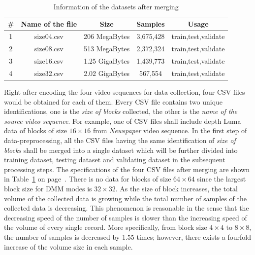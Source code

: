 \begin{table}[H]
    \caption{Information of the datasets after merging}
    \bigskip\label{tab:datasets-after-first-step}
    \centering
    \begin{tabular}{c c c c c}
        \toprule
        \# & Name of the file & Size & Samples & Usage\\
        \midrule
        1 & size04.csv & 206 MegaBytes & 3,675,428 & train,test,validate\\
        2 & size08.csv & 513 MegaBytes & 2,372,324 & train,test,validate\\
        3 & size16.csv & 1.25 GigaBytes & 1,439,773 & train,test,validate\\
        4 & size32.csv & 2.02 GigaBytes & 567,554 & train,test,validate\\
        \bottomrule
    \end{tabular}
\end{table}
Right after encoding the four video sequences for data 
collection, four CSV files
would be obtained for each of them.
Every CSV file contains two unique identifications,
one is the \emph{size of blocks} collected, the other is the 
\emph{name of the source video sequence}.
For example, one of CSV files shall include depth 
Luma data of blocks of size \(16\times16\) from
\emph{Newspaper} video sequence.
In the first step of data-preprocessing, all
the CSV files having the same identification of 
\emph{size of blocks} shall be merged into a single dataset
which will be further divided into training dataset,
testing dataset and validating dataset in the subsequent 
processing steps.
The specifications of the four CSV files after merging 
are shown in Table~\ref{tab:datasets-after-first-step}
on page~\pageref{tab:datasets-after-first-step}.
There is no data for blocks of size \(64\times64\)
since the largest block size for DMM modes is \(32\times32\).
As the size of block 
increases, the total volume of the collected data is growing
while the total number of samples of the collected data is
decreasing.
This phenomenon is reasonable in the sense that
the decreasing speed of the number of samples is slower 
than the increasing speed of the volume of every single
record.
More specifically, from block size \(4\times4\) to \(8\times8\),
the number of samples is decreased by 1.55 times; however,
there exists a fourfold increase of the volume size in 
each sample.

